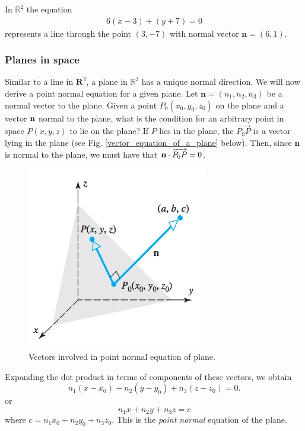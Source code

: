 \documentclass[12pt,letterpaper,reqno]{article}
\numberwithin{equation}{section}
\begin{document}
\begin{example}
In $\mathbb{R}^2$ the equation
\begin{align*}
	6(x-3)+(y+7)=0
\end{align*}	
represents a line through the point $(3,-7)$ with normal vector $\mathbf{n}=(6,1)$.
\end{example}


\subsubsection{Planes in space}
Similar to a line in $\mathbf{R}^2$, a plane in $\mathbb{R}^3$ has a unique normal direction. We will now derive a point normal equation for a given plane. Let $\mathbf{n}=(n_1,n_2,n_3)$ be a normal vector to the plane. Given a point $P_0(x_0,y_0,z_0)$ on the plane and a vector ${\bf n}$ normal to the plane, what is the condition for an arbitrary point in space $P(x,y,z)$ to lie on the plane? If $P$ lies in the plane, the $\overrightarrow{P_0P}$ is a vector lying in the plane (see Fig. \ref{vector_equation_of_a_plane} below). Then, since ${\bf n}$ is normal to the plane, we must have that ${\bf n} \cdot \overrightarrow{P_0P}=0$.

\begin{figure}[h]\label{fig:vector_equation_of_a_plane}
	\begin{center}
	\includegraphics[scale=0.5]{figures_mvc/vector_equation_of_a_plane}
\end{center}
\caption{Vectors involved in point normal equation of plane.}
\end{figure}
Expanding the dot product in terms of components of these vectors, we obtain
	\begin{equation}
		n_1(x-x_0)+n_2(y-y_0)+n_3(z-z_0)=0.
	\end{equation}
or 
	\begin{equation}
		n_1x+n_2y+n_3z=c
	\end{equation}
	where $c=n_1x_0+n_2y_0+n_3z_0$. This is the \emph{point normal} equation of the plane.
\end{document}
